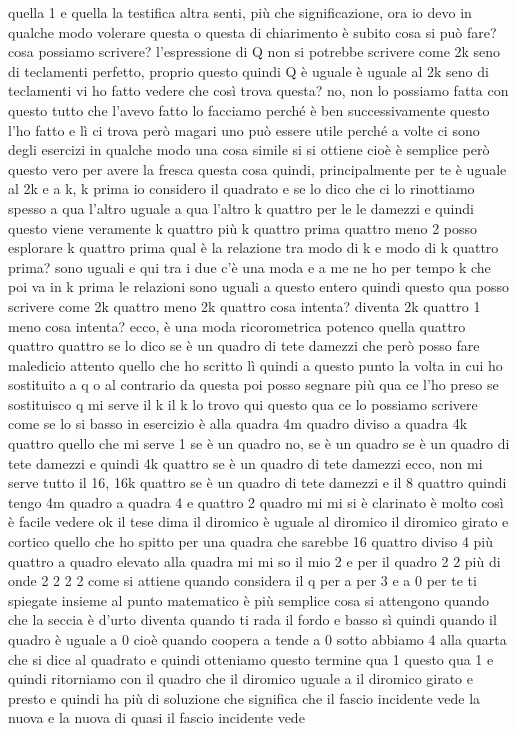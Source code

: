 \begin{soluzione}
   quella 1 e quella la testifica altra senti, più che significazione, ora io devo in qualche modo volerare questa o questa di chiarimento è subito cosa si può fare? cosa possiamo scrivere? l'espressione di Q non si potrebbe scrivere come 2k seno di teclamenti perfetto, proprio questo quindi Q è uguale è uguale al 2k seno di teclamenti vi ho fatto vedere che così trova questa? no, non lo possiamo fatta con questo tutto che l'avevo fatto lo facciamo perché è ben successivamente questo l'ho fatto e lì ci trova però magari uno può essere utile perché a volte ci sono degli esercizi in qualche modo una cosa simile si si ottiene cioè è semplice però questo vero per avere la fresca questa cosa quindi, principalmente per te è uguale al 2k e a k, k prima io considero il quadrato e se lo dico che ci lo rinottiamo spesso a qua l'altro uguale a qua l'altro k quattro per le le damezzi e quindi questo viene veramente k quattro più k quattro prima quattro meno 2 posso esplorare k quattro prima qual è la relazione tra modo di k e modo di k quattro prima? sono uguali e qui tra i due c'è una moda e a me ne ho per tempo k che poi va in k prima le relazioni sono uguali a questo entero quindi questo qua posso scrivere come 2k quattro meno 2k quattro cosa intenta? diventa 2k quattro 1 meno cosa intenta? ecco, è una moda ricorometrica potenco quella quattro quattro quattro se lo dico se è un quadro di tete damezzi che però posso fare maledicio attento quello che ho scritto lì quindi a questo punto la volta in cui ho sostituito a q o al contrario da questa poi posso segnare più qua ce l'ho preso se sostituisco q mi serve il k il k lo trovo qui questo qua ce lo possiamo scrivere come se lo si basso in esercizio è alla quadra 4m quadro diviso a quadra 4k quattro quello che mi serve 1 se è un quadro no, se è un quadro se è un quadro di tete damezzi e quindi 4k quattro se è un quadro di tete damezzi ecco, non mi serve tutto il 16, 16k quattro se è un quadro di tete damezzi e il 8 quattro quindi tengo 4m quadro a quadra 4 e quattro 2 quadro mi mi si è clarinato è molto così è facile vedere ok il tese dima il diromico è uguale al diromico il diromico girato e cortico quello che ho spitto per una quadra che sarebbe 16 quattro diviso 4 più quattro a quadro elevato alla quadra mi mi so il mio 2 e per il quadro 2 2 più di onde 2 2 2 2 come si attiene quando considera il q per a per 3 e a 0 per te ti spiegate insieme al punto matematico è più semplice cosa si attengono quando che la seccia è d'urto diventa quando ti rada il fordo e basso sì quindi quando il quadro è uguale a 0 cioè quando coopera a tende a 0 sotto abbiamo 4 alla quarta che si dice al quadrato e quindi otteniamo questo termine qua 1 questo qua 1 e quindi ritorniamo con il quadro che il diromico uguale a il diromico girato e presto e quindi ha più di soluzione che significa che il fascio incidente vede la nuova e la nuova di quasi il fascio incidente vede 
   

\end{soluzione}
